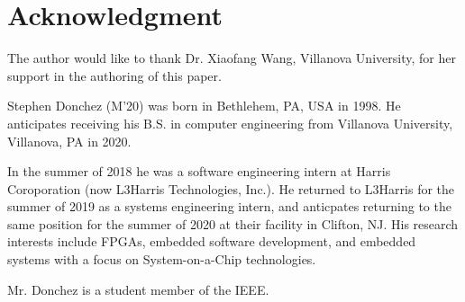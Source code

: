 \documentclass[journal]{IEEEtran}
\begin{document}
\section*{Acknowledgment}
The author would like to thank Dr. Xiaofang Wang, Villanova University, for her support in
the authoring of this paper.




\begin{IEEEbiography}
	{Stephen Donchez}
(M'20) was born in Bethlehem, PA, USA in 1998. He anticipates receiving his B.S. in
computer engineering from Villanova University, Villanova, PA in 2020.

In the summer of 2018 he was a software engineering intern at Harris Coroporation 
(now L3Harris Technologies, Inc.). He returned to L3Harris for the summer of 2019 as a 
systems engineering intern, and anticpates returning to the same position for the summer
of 2020 at their facility in Clifton, NJ. His research interests include FPGAs, embedded
software development, and embedded systems with a focus on System-on-a-Chip technologies.

Mr. Donchez is a student member of the IEEE.
\end{IEEEbiography}
\end{document}
